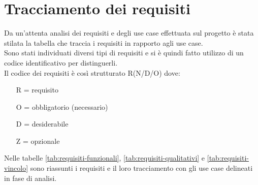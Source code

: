 \begin{usecase}{0}{}
\usecasepre{}
\usecasepost{}
\usecasedesc{}
\label{uc:}
\end{usecase}

\begin{usecase}{0}{}
\usecasepre{}
\usecasepost{}
\usecasedesc{}
\label{uc:}
\end{usecase}

\begin{usecase}{0}{}
\usecasepre{}
\usecasepost{}
\usecasedesc{}
\label{uc:}
\end{usecase}

\begin{usecase}{0}{}
\usecasepre{}
\usecasepost{}
\usecasedesc{}
\label{uc:}
\end{usecase}

\begin{usecase}{0}{}
\usecasepre{}
\usecasepost{}
\usecasedesc{}
\label{uc:}
\end{usecase}

\begin{usecase}{0}{}
\usecasepre{}
\usecasepost{}
\usecasedesc{}
\label{uc:}
\end{usecase}

\begin{usecase}{0}{}
\usecasepre{}
\usecasepost{}
\usecasedesc{}
\label{uc:}
\end{usecase}

\section{Tracciamento dei requisiti}

Da un'attenta analisi dei requisiti e degli use case effettuata sul progetto è stata stilata la tabella che traccia i requisiti in rapporto agli use case.\\
Sono stati individuati diversi tipi di requisiti e si è quindi fatto utilizzo di un codice identificativo per distinguerli.\\
Il codice dei requisiti è così strutturato R(N/D/O) dove:
\begin{enumerate}
	\item[R =] requisito
    \item[O =] obbligatorio (necessario)
    \item[D =] desiderabile
    \item[Z =] opzionale
\end{enumerate}
Nelle tabelle \ref{tab:requisiti-funzionali}, \ref{tab:requisiti-qualitativi} e \ref{tab:requisiti-vincolo} sono riassunti i requisiti e il loro tracciamento con gli use case delineati in fase di analisi.

